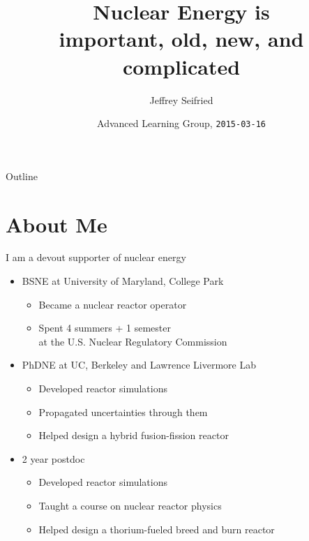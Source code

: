 \documentclass{beamer}
\title{Nuclear Energy is \\ important, old, new, and complicated}
\author{Jeffrey Seifried}
\institute{Ad Delivery Team, Yelp}
\date{Advanced Learning Group, \texttt{2015-03-16}}
\begin{document}
\begin{frame}
  \titlepage
\end{frame}

\begin{frame}{Outline}
  \tableofcontents
\end{frame}


\section{About Me}

    \begin{frame}{I am a devout supporter of nuclear energy}

        \begin{itemize}

            \item BSNE at University of Maryland, College Park
            \begin{itemize}
                \item Became a nuclear reactor operator
                \item Spent 4 summers + 1 semester \\ at the U.S. Nuclear Regulatory Commission
            \end{itemize}

            \pause

            \item PhDNE at UC, Berkeley and Lawrence Livermore Lab
            \begin{itemize}
                \item Developed reactor simulations
                \item Propagated uncertainties through them
                \item Helped design a hybrid fusion-fission reactor
            \end{itemize}

            \pause

            \item 2 year postdoc
            \begin{itemize}
                \item Developed reactor simulations
                \item Taught a course on nuclear reactor physics
                \item Helped design a thorium-fueled breed and burn reactor
            \end{itemize}
        \end{itemize}

    \end{frame}
\end{document}
